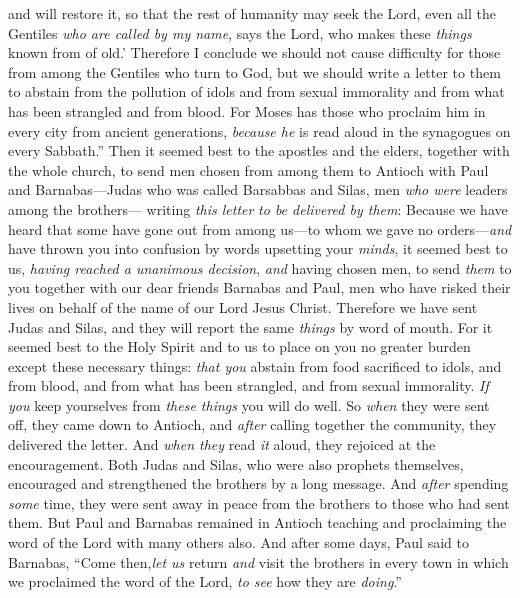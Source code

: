 \begin{biblechapter}
and will restore it,
\verse so that the rest of humanity may seek the Lord, 
even all the Gentiles \textit{who are called by my name}, 
says the Lord, who makes these \textit{things}
\verse known from of old.’
\verse Therefore I conclude we should not cause difficulty for those from among the Gentiles who turn to God,
\verse but we should write a letter to them to abstain from the pollution of idols and from sexual immorality and from what has been strangled and from blood.
\verse For Moses has those who proclaim him in every city from ancient generations, \textit{because he} is read aloud in the synagogues on every Sabbath.”
 Then it seemed best to the apostles and the elders, together with the whole church, to send men chosen from among them to Antioch with Paul and Barnabas—Judas who was called Barsabbas and Silas, men \textit{who were} leaders among the brothers—
\verse writing \textit{this letter} \textit{to be delivered by them}:
\verse Because we have heard that some have gone out from among us—to whom we gave no orders—\textit{and} have thrown you into confusion by words upsetting your \textit{minds},
\verse it seemed best to us, \textit{having reached a unanimous decision}, \textit{and} having chosen men, to send \textit{them} to you together with our dear friends Barnabas and Paul,
\verse men who have risked their lives on behalf of the name of our Lord Jesus Christ.
\verse Therefore we have sent Judas and Silas, and they will report the same \textit{things} by word of mouth.
\verse For it seemed best to the Holy Spirit and to us to place on you no greater burden except these necessary things:
\verse \textit{that you} abstain from food sacrificed to idols, and from blood, and from what has been strangled, and from sexual immorality. \textit{If you} keep yourselves from \textit{these things} you will do well.
 So \textit{when} they were sent off, they came down to Antioch, and \textit{after} calling together the community, they delivered the letter.
\verse And \textit{when they} read \textit{it} aloud, they rejoiced at the encouragement.
\verse Both Judas and Silas, who were also prophets themselves, encouraged and strengthened the brothers by a long message.
\verse And \textit{after} spending \textit{some} time, they were sent away in peace from the brothers to those who had sent them.
\verse But Paul and Barnabas remained in Antioch teaching and proclaiming the word of the Lord with many others also.
 And after some days, Paul said to Barnabas, “Come then,\textit{let us} return \textit{and} visit the brothers in every town in which we proclaimed the word of the Lord, \textit{to see} how they are \textit{doing}.”

\end{biblechapter}
